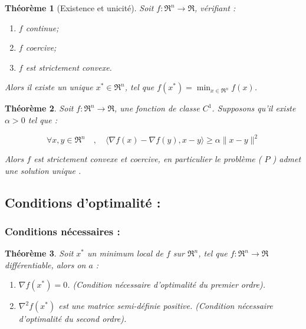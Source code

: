 \documentclass[a4paper,12pt,openany]{book}
\theoremstyle{plain}
\newtheorem{theorem}{Théorème}[section]
\theoremstyle{definition}
\theoremstyle{remark}
\theoremstyle{nbstyle}
\begin{document}
\begin{theorem}[Existence et unicité] 
	Soit $f: \Re^{n} \rightarrow \Re$, vérifiant :
	
	\begin{enumerate}
		\item $f$ continue;
		\item $f$ coercive;
		\item $f$ est strictement convexe.
	\end{enumerate}
	
	Alors il existe un unique $x^{*} \in \Re^{n}$, tel que $f\left(x^{*}\right)=\displaystyle\min _{x \in \Re^{n}} f(x)$.\\
\end{theorem}

\begin{theorem}
	Soit $f: \Re^{n} \rightarrow \Re$, une fonction de classe $C^{1}$. Supposons qu'il existe $\alpha>0$ tel que :
	
	$$
	\forall x, y \in \Re^{n} \quad, \quad\langle\nabla f(x)-\nabla f(y), x-y\rangle \geq \alpha\|x-y\|^{2}
	$$
	
	Alors $f$ est strictement convexe et coercive, en particulier le problème ( $P$ ) admet une solution unique .
\end{theorem}
	
	\subsection{Conditions d'optimalité :}
	\subsubsection{Conditions nécessaires :}
	\begin{theorem} Soit $x^{*}$ un minimum local de $f$ sur $\Re^{n}$, tel que $f: \Re^{n} \rightarrow \Re$ différentiable, alors on $a$ :
		
		\begin{enumerate}
			\item $\nabla f\left(x^{*}\right)=0$. (Condition nécessaire d'optimalité du premier ordre).
			\item $\nabla^{2} f\left(x^{*}\right)$ est une matrice semi-définie positive. (Condition nécessaire d'optimalité du second ordre).
		\end{enumerate}
	\end{theorem}
	
\end{document}
